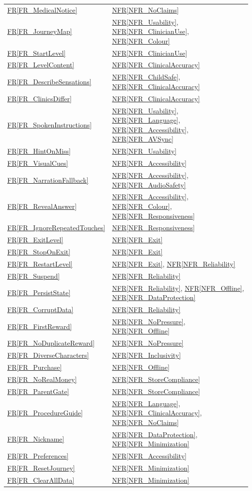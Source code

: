 \documentclass[10pt]{article}
\newcommand{\rref}[1]{\hyperref[#1]{FR\ref*{#1}}}
\newcommand{\nfrref}[1]{\hyperref[#1]{NFR\ref*{#1}}}
\begin{document}
\begin{longtable}{p{} p{}}
\rref{FR_MedicalNotice} & \nfrref{NFR_NoClaims} \\
\rref{FR_JourneyMap} & \nfrref{NFR_Usability}, \nfrref{NFR_ClinicianUse}, \nfrref{NFR_Colour} \\
\rref{FR_StartLevel} & \nfrref{NFR_ClinicianUse} \\
\rref{FR_LevelContent} & \nfrref{NFR_ClinicalAccuracy} \\
\rref{FR_DescribeSensations} & \nfrref{NFR_ChildSafe}, \nfrref{NFR_ClinicalAccuracy} \\
\rref{FR_ClinicsDiffer} & \nfrref{NFR_ClinicalAccuracy} \\
\rref{FR_SpokenInstructions} & \nfrref{NFR_Usability}, \nfrref{NFR_Language}, \nfrref{NFR_Accessibility}, \nfrref{NFR_AVSync} \\
\rref{FR_HintOnMiss} & \nfrref{NFR_Usability} \\
\rref{FR_VisualCues} & \nfrref{NFR_Accessibility} \\
\rref{FR_NarrationFallback} & \nfrref{NFR_Accessibility}, \nfrref{NFR_AudioSafety} \\
\rref{FR_RevealAnswer} & \nfrref{NFR_Accessibility}, \nfrref{NFR_Colour}, \nfrref{NFR_Responsiveness} \\
\rref{FR_IgnoreRepeatedTouches} & \nfrref{NFR_Responsiveness} \\
\rref{FR_ExitLevel} & \nfrref{NFR_Exit} \\
\rref{FR_StopOnExit} & \nfrref{NFR_Exit} \\
\rref{FR_RestartLevel} & \nfrref{NFR_Exit}, \nfrref{NFR_Reliability} \\
\rref{FR_Suspend} & \nfrref{NFR_Reliability} \\
\rref{FR_PersistState} & \nfrref{NFR_Reliability}, \nfrref{NFR_Offline}, \nfrref{NFR_DataProtection} \\
\rref{FR_CorruptData} & \nfrref{NFR_Reliability} \\
\rref{FR_FirstReward} & \nfrref{NFR_NoPressure}, \nfrref{NFR_Offline} \\
\rref{FR_NoDuplicateReward} & \nfrref{NFR_NoPressure} \\
\rref{FR_DiverseCharacters} & \nfrref{NFR_Inclusivity} \\
\rref{FR_Purchase} & \nfrref{NFR_Offline} \\
\rref{FR_NoRealMoney} & \nfrref{NFR_StoreCompliance} \\
\rref{FR_ParentGate} & \nfrref{NFR_StoreCompliance} \\
\rref{FR_ProcedureGuide} & \nfrref{NFR_Language}, \nfrref{NFR_ClinicalAccuracy}, \nfrref{NFR_NoClaims} \\
\rref{FR_Nickname} & \nfrref{NFR_DataProtection}, \nfrref{NFR_Minimization} \\
\rref{FR_Preferences} & \nfrref{NFR_Accessibility} \\
\rref{FR_ResetJourney} & \nfrref{NFR_Minimization} \\
\rref{FR_ClearAllData} & \nfrref{NFR_Minimization} \\
\end{longtable}
\end{document}
